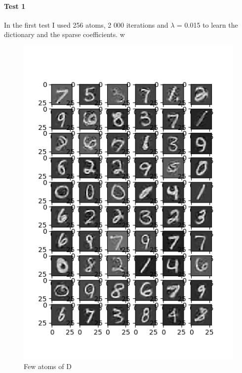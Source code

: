 \documentclass[a4paper,10pt]{article}
\begin{document}
\paragraph{Test 1}
In the first test I used 256 atoms, 2 000 iterations and $\lambda$ = 0.015 to learn the dictionary and the sparse coefficients. 
w\begin{figure}[h]
 \centering
 \includegraphics[scale=0.82]{Results/SPAMS_X_ALL_K256/D.png}
 \caption{Few atoms of D}
\end{figure}
\end{document}
